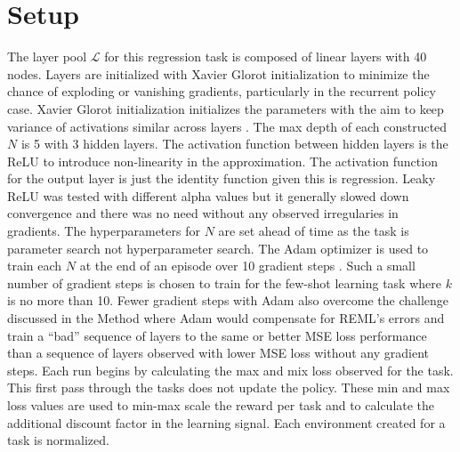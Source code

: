 \section{Setup}
The layer pool $\mathcal{L}$ for this regression task is composed of linear 
layers with 40 nodes. Layers are initialized with Xavier Glorot initialization to 
minimize the chance of exploding or vanishing gradients, particularly in the 
recurrent policy case. Xavier Glorot initialization initializes the parameters 
with the aim to keep variance of activations similar across layers \cite{XavBen:10}.
The max depth of each constructed $N$ is 5 with 3 hidden 
layers. The activation function between hidden layers is the ReLU to introduce 
non-linearity in the approximation. The activation function for the output layer
is just the identity function given this is regression. Leaky ReLU was tested with 
different alpha values but it generally slowed down convergence and there was no need
without any observed irregularies in gradients. The hyperparameters for $N$ are 
set ahead of time as the task is parameter search not hyperparameter search. 
The Adam optimizer is used to train each $N$ at the end of an episode over 10 gradient 
steps \cite{KinBa:14}. Such a small number of gradient steps is chosen to train for the few-shot 
learning task where $k$ is no more than 10. Fewer gradient steps with Adam also 
overcome the challenge discussed in the Method where Adam would compensate for REML's 
errors and train a ``bad'' sequence of layers to the same or better MSE loss performance 
than a sequence of layers observed with lower MSE loss without any gradient steps. Each
run begins by calculating the max and mix loss observed for the task. This first pass
through the tasks does not update the policy. These min and max loss values are used to 
min-max scale the reward per task and to calculate the additional discount factor in the
learning signal. Each environment created for a task is normalized.

